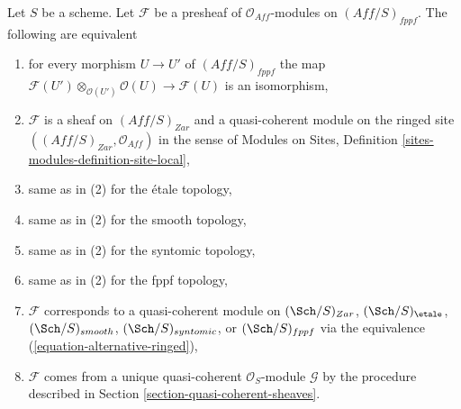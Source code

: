 \begin{lemma}
\label{lemma-quasi-coherent-alternative}
Let $S$ be a scheme. Let $\mathcal{F}$ be a presheaf
of $\mathcal{O}_{\textit{Aff}}$-modules on $(\textit{Aff}/S)_{fppf}$.
The following are equivalent
\begin{enumerate}
\item for every morphism $U \to U'$ of $(\textit{Aff}/S)_{fppf}$ the map
$\mathcal{F}(U') \otimes_{\mathcal{O}(U')} \mathcal{O}(U) \to \mathcal{F}(U)$
is an isomorphism,
\item $\mathcal{F}$ is a sheaf on $(\textit{Aff}/S)_{Zar}$ and
a quasi-coherent module on the ringed site
$((\textit{Aff}/S)_{Zar}, \mathcal{O}_{\textit{Aff}})$ in the sense of
Modules on Sites, Definition \ref{sites-modules-definition-site-local},
\item same as in (2) for the \'etale topology,
\item same as in (2) for the smooth topology,
\item same as in (2) for the syntomic topology,
\item same as in (2) for the fppf topology,
\item $\mathcal{F}$ corresponds to a quasi-coherent module on
$(\Sch/S)_{Zar}$,
$(\Sch/S)_\etale$,
$(\Sch/S)_{smooth}$,
$(\Sch/S)_{syntomic}$, or
$(\Sch/S)_{fppf}$
via the equivalence (\ref{equation-alternative-ringed}),
\item $\mathcal{F}$ comes from a unique quasi-coherent
$\mathcal{O}_S$-module $\mathcal{G}$ by the procedure
described in Section \ref{section-quasi-coherent-sheaves}.
\end{enumerate}
\end{lemma}

